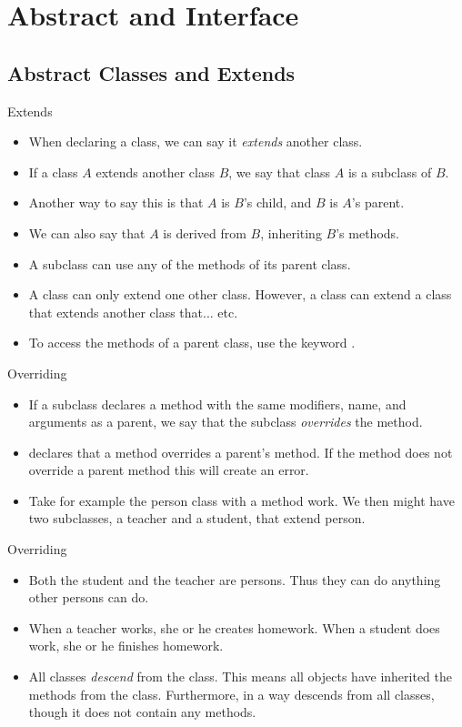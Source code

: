 
\section{Abstract and Interface}
\subsection{Abstract Classes and Extends}

\begin{frame}{Extends}
\begin{itemize}
\item When declaring a class, we can say it \emph{extends} another class. \pause
\item If a class $A$ extends another class $B$, we say that class $A$ is a subclass of $B$.  \pause
\item Another way to say this is that $A$ is $B$'s child, and $B$ is $A$'s parent.  \pause
\item We can also say that $A$ is derived from $B$, inheriting $B$'s methods.  \pause
\item A subclass can use any of the methods of its parent class.  \pause
\item A class can only extend one other class. However, a class can extend a class that extends another class that... etc.
\item To access the methods of a parent class, use the keyword \texttt{}.
\end{itemize}
\end{frame}


\begin{frame}{Overriding}
\begin{itemize}
\item If a subclass declares a method with the same modifiers, name, and arguments as a parent, we say that the subclass \emph{overrides} the method. \pause
\item {} declares that a method overrides a parent's method. If the method does not override a parent method this will create an error.  \pause
\item Take for example the person class with a method work. We then might have two subclasses, a teacher and a student, that extend person. \pause
\end{itemize}
\end{frame}

\begin{frame}{Overriding}
\begin{itemize}

\item Both the student and the teacher are persons. Thus they can do anything other persons can do.  \pause
\item When a teacher works, she or he creates homework. When a student does work, she or he finishes homework.  \pause
\item All classes \emph{descend} from the  class. This means all objects have inherited the methods from the  class. Furthermore, in a way  descends from all classes, though it does not contain any methods.
\end{itemize}
\end{frame}


